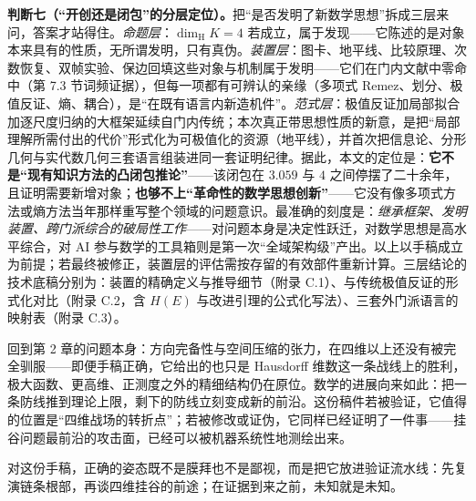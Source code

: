 \textbf{判断七（“开创还是闭包”的分层定位）。}\cfM{}把“是否发明了新数学思想”拆成三层来问，答案才站得住。\emph{命题层}：$\dim_{\mathrm{H}}K=4$ 若成立，属于发现——它陈述的是对象本来具有的性质，无所谓发明，只有真伪。\emph{装置层}：图卡、地平线、比较原理、次数恢复、双帧实验、保边回填这些对象与机制属于发明——它们在门内文献中零命中（第 7.3 节词频证据），但每一项都有可辨认的亲缘（多项式 Remez、划分、极值反证、熵、耦合），是“在既有语言内新造机件”。\emph{范式层}：极值反证加局部拟合加逐尺度归纳的大框架延续自门内传统；本次真正带思想性质的新意，是把“局部理解所需付出的代价”形式化为可极值化的资源（地平线），并首次把信息论、分形几何与实代数几何三套语言组装进同一套证明纪律。据此，本文的定位是：\textbf{它不是“现有知识方法的凸闭包推论”}——该闭包在 $3.059$ 与 $4$ 之间停摆了二十余年，且证明需要新增对象；\textbf{也够不上“革命性的数学思想创新”}——它没有像多项式方法或熵方法当年那样重写整个领域的问题意识。最准确的刻度是：\emph{继承框架、发明装置、跨门派综合的破局性工作}——对问题本身是决定性跃迁，对数学思想是高水平综合，对 AI 参与数学的工具箱则是第一次“全域架构级”产出。以上以手稿成立为前提；若最终被修正，装置层的评估需按存留的有效部件重新计算。三层结论的技术底稿分别为：装置的精确定义与推导细节（附录 C.1）、与传统极值反证的形式化对比（附录 C.2，含 $H(E)$ 与改进引理的公式化写法）、三套外门派语言的映射表（附录 C.3）。

回到第 2 章的问题本身：方向完备性与空间压缩的张力，在四维以上还没有被完全驯服——即便手稿正确，它给出的也只是 Hausdorff 维数这一条战线上的胜利，极大函数、更高维、正测度之外的精细结构仍在原位。数学的进展向来如此：把一条防线推到理论上限，剩下的防线立刻变成新的前沿。这份稿件若被验证，它值得的位置是“四维战场的转折点”；若被修改或证伪，它同样已经证明了一件事——挂谷问题最前沿的攻击面，已经可以被机器系统性地测绘出来。

\begin{keybox}[可记忆主句]
对这份手稿，正确的姿态既不是膜拜也不是鄙视，而是把它放进验证流水线：先复演链条根部，再谈四维挂谷的前途；在证据到来之前，未知就是未知。
\end{keybox}